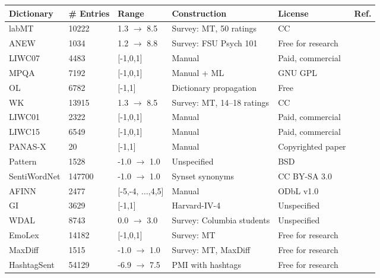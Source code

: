 {\scriptsize
  \begin{tabular*}{\linewidth}{ l | l | l | l | l | l}
    \hline
    Dictionary & \# Entries & Range & Construction & License & Ref.\\
    \hline
    \hline
    labMT & 10222 & 1.3 $\to$ 8.5 & Survey: MT, 50 ratings & CC & \cite{dodds2015human}\\
    ANEW & 1034 & 1.2 $\to$ 8.8 & Survey: FSU Psych 101 & Free for research & \cite{bradley1999affective}\\
    LIWC07 & 4483 & [-1,0,1] & Manual & Paid, commercial & \cite{pennebaker2001linguistic}\\
    MPQA & 7192 & [-1,0,1] & Manual + ML & GNU GPL & \cite{wilson2005recognizing}\\
    OL & 6782 & [-1,1] & Dictionary propagation & Free & \cite{liu2010sentiment}\\
    WK & 13915 & 1.3 $\to$ 8.5 & Survey: MT, 14--18 ratings & CC & \cite{warriner2013norms}\\
    \hline
    LIWC01 & 2322 & [-1,0,1] & Manual & Paid, commercial & \cite{pennebaker2001linguistic}\\
    LIWC15 & 6549 & [-1,0,1] & Manual & Paid, commercial & \cite{pennebaker2001linguistic}\\
    PANAS-X & 20 & [-1,1] & Manual & Copyrighted paper & \cite{watson1999panas}\\
    Pattern & 1528 & -1.0 $\to$ 1.0 & Unspecified & BSD & \cite{de2012pattern}\\
    SentiWordNet & 147700 & -1.0 $\to$ 1.0 & Synset synonyms & CC BY-SA 3.0 & \cite{baccianella2010sentiwordnet}\\
    AFINN & 2477 & [-5,-4, $\ldots$,4,5] & Manual & ODbL v1.0 & \cite{nielsen2011new}\\
    GI & 3629 & [-1,1] & Harvard-IV-4 & Unspecified & \cite{stone1966general}\\
    WDAL & 8743 & 0.0 $\to$ 3.0 & Survey: Columbia students & Unspecified & \cite{whissell1986dictionary}\\
    EmoLex & 14182 & [-1,0,1] & Survey: MT & Free for research & \cite{mohammad2013crowdsourcing}\\
    MaxDiff & 1515 & -1.0 $\to$ 1.0 & Survey: MT, MaxDiff & Free for research & \cite{kiritchenko2014sentiment}\\
    HashtagSent & 54129 & -6.9 $\to$ 7.5 & PMI with hashtags & Free for research & \cite{zhu2014nrc}\\

\end{tabular*}}
